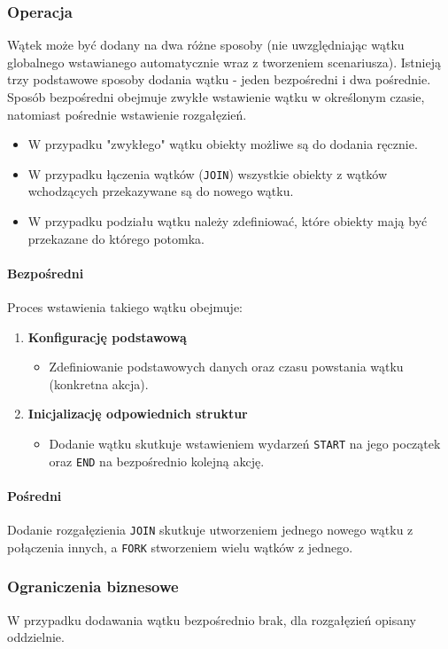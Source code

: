 \subsubsection{Operacja}
Wątek może być dodany na dwa różne sposoby (nie uwzględniając wątku globalnego wstawianego automatycznie wraz z tworzeniem scenariusza). Istnieją trzy podstawowe sposoby dodania wątku - jeden bezpośredni i dwa pośrednie. 
Sposób bezpośredni obejmuje zwykłe wstawienie wątku w określonym czasie, natomiast pośrednie wstawienie rozgałęzień.
\begin{itemize}
    \item W przypadku "zwykłego" wątku obiekty możliwe są do dodania ręcznie.
    \item W przypadku łączenia wątków (\texttt{JOIN}) wszystkie obiekty z wątków wchodzących przekazywane są do nowego wątku.
    \item W przypadku podziału wątku należy zdefiniować, które obiekty mają być przekazane do którego potomka.
\end{itemize}

\paragraph{Bezpośredni} Proces wstawienia takiego wątku obejmuje:
\begin{enumerate}
    \item \textbf{Konfigurację podstawową}
    \begin{itemize}
        \item Zdefiniowanie podstawowych danych oraz czasu powstania wątku (konkretna akcja).
    \end{itemize}
    \item \textbf{Inicjalizację odpowiednich struktur}
    \begin{itemize}
        \item Dodanie wątku skutkuje wstawieniem wydarzeń \texttt{START} na jego początek oraz \texttt{END} na bezpośrednio kolejną akcję.
    \end{itemize}
\end{enumerate}

\paragraph{Pośredni}
Dodanie rozgałęzienia \texttt{JOIN} skutkuje utworzeniem jednego nowego wątku z połączenia innych, a \texttt{FORK} stworzeniem wielu wątków z jednego.

\subsubsection{Ograniczenia biznesowe}
W przypadku dodawania wątku bezpośrednio brak, dla rozgałęzień opisany oddzielnie.


